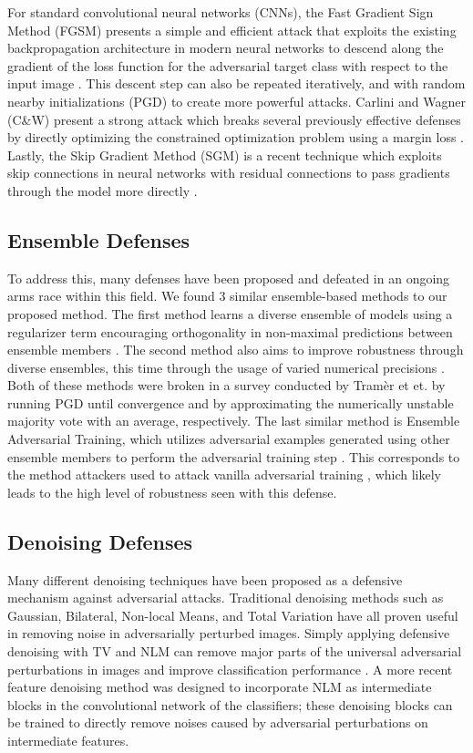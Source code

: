 \documentclass[10pt,journal,compsoc]{IEEEtran}
\begin{document}
For standard convolutional neural networks (CNNs), the Fast Gradient Sign Method (FGSM) presents a simple and efficient attack that exploits the existing backpropagation architecture in modern neural networks to descend along the gradient of the loss function for the adversarial target class with respect to the input image \cite{fgsm}. This descent step can also be repeated iteratively, and with random nearby initializations (PGD) \cite{pgd} to create more powerful attacks. Carlini and Wagner (C&W) present a strong attack which breaks several previously effective defenses by directly optimizing the constrained optimization problem using a margin loss \cite{cw}. Lastly, the Skip Gradient Method (SGM) is a recent technique which exploits skip connections in neural networks with residual connections to pass gradients through the model more directly \cite{sgm}.

\subsection{Ensemble Defenses}
To address this, many defenses have been proposed and defeated in an ongoing arms race within this field. We found 3 similar ensemble-based methods to our proposed method. The first method learns a diverse ensemble of models using a regularizer term encouraging orthogonality in non-maximal predictions between ensemble members \cite{diversity}. The second method also aims to improve robustness through diverse ensembles, this time through the usage of varied numerical precisions \cite{empir}. Both of these methods were broken in a survey conducted by Tramèr et et. \cite{survey} by running PGD until convergence and by approximating the numerically unstable majority vote with an average, respectively. The last similar method is Ensemble Adversarial Training, which utilizes adversarial examples generated using other ensemble members to perform the adversarial training step \cite{eat}. This corresponds to the method attackers used to attack vanilla adversarial training \cite{pbba}, which likely leads to the high level of robustness seen with this defense. 

\subsection{Denoising Defenses}
Many different denoising techniques have been proposed as a defensive mechanism against adversarial attacks. Traditional denoising methods such as Gaussian, Bilateral, Non-local Means, and Total Variation have all proven useful in removing noise in adversarially perturbed images. Simply applying defensive denoising with TV and NLM can remove major parts of the universal adversarial perturbations in images and improve classification performance \cite{cite11}. A more recent feature denoising \cite{cite12} method  was designed to incorporate NLM as intermediate blocks in the convolutional network of the classifiers; these denoising blocks can be trained to directly remove noises caused by adversarial perturbations on intermediate features.
\end{document}
